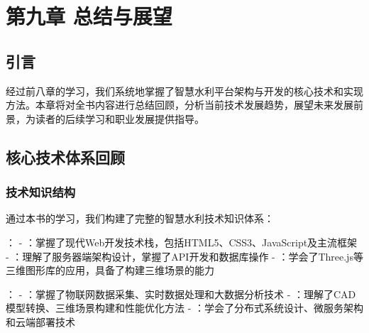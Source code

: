 \hypertarget{ux7b2cux4e5dux7ae0-ux603bux7ed3ux4e0eux5c55ux671b}{%
\section{第九章 总结与展望}\label{ux7b2cux4e5dux7ae0-ux603bux7ed3ux4e0eux5c55ux671b}}


\hypertarget{ux5f15ux8a00}{%
\subsection{引言}\label{ux5f15ux8a00}}

经过前八章的学习，我们系统地掌握了智慧水利平台架构与开发的核心技术和实现方法。本章将对全书内容进行总结回顾，分析当前技术发展趋势，展望未来发展前景，为读者的后续学习和职业发展提供指导。

\hypertarget{ux6838ux5fc3ux6280ux672fux4f53ux7cfbux56deux987e}{%
\subsection{核心技术体系回顾}\label{ux6838ux5fc3ux6280ux672fux4f53ux7cfbux56deux987e}}

\hypertarget{ux6280ux672fux77e5ux8bc6ux7ed3ux6784}{%
\subsubsection{技术知识结构}\label{ux6280ux672fux77e5ux8bc6ux7ed3ux6784}}

通过本书的学习，我们构建了完整的智慧水利技术知识体系：

： - ：掌握了现代Web开发技术栈，包括HTML5、CSS3、JavaScript及主流框架 - ：理解了服务器端架构设计，掌握了API开发和数据库操作 - ：学会了Three.js等三维图形库的应用，具备了构建三维场景的能力

： - ：掌握了物联网数据采集、实时数据处理和大数据分析技术 - ：理解了CAD模型转换、三维场景构建和性能优化方法 - ：学会了分布式系统设计、微服务架构和云端部署技术

